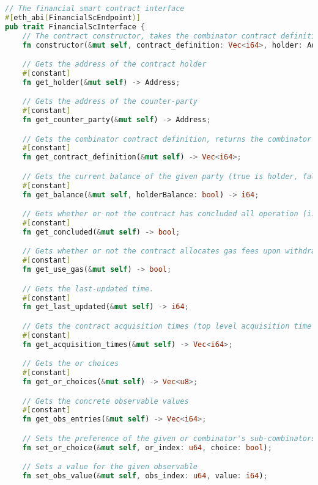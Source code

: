 \begin{lstlisting}[language=Rust, caption={The ABI of the smart contract implementation of SmartFin, defined as a trait in Rust$^1$. See section \ref{smart-contract-ABI} for details.}, captionpos=b, breaklines=true, postbreak=\mbox{\textcolor{red}{$\hookrightarrow$}\space}]
// The financial smart contract interface
#[eth_abi(FinancialScEndpoint)]
pub trait FinancialScInterface {
    // The contract constructor, takes the combinator contract definition (serialized) and the holder address
    fn constructor(&mut self, contract_definition: Vec<i64>, holder: Address, use_gas: bool);

    // Gets the address of the contract holder
    #[constant]
    fn get_holder(&mut self) -> Address;

    // Gets the address of the counter-party
    #[constant]
    fn get_counter_party(&mut self) -> Address;

    // Gets the combinator contract definition, returns the combinator contract serialized
    #[constant]
    fn get_contract_definition(&mut self) -> Vec<i64>;

    // Gets the current balance of the given party (true is holder, false counter-party)
    #[constant]
    fn get_balance(&mut self, holderBalance: bool) -> i64;

    // Gets whether or not the contract has concluded all operation (i.e. updating will never change the balance).
    #[constant]
    fn get_concluded(&mut self) -> bool;

    // Gets whether or not the contract allocates gas fees upon withdrawal.
    #[constant]
    fn get_use_gas(&mut self) -> bool;

    // Gets the last-updated time.
    #[constant]
    fn get_last_updated(&mut self) -> i64;

    // Gets the contract acquisition times (top level acquisition time and anytime acquisition times)
    #[constant]
    fn get_acquisition_times(&mut self) -> Vec<i64>;

    // Gets the or choices
    #[constant]
    fn get_or_choices(&mut self) -> Vec<u8>;

    // Gets the concrete observable values
    #[constant]
    fn get_obs_entries(&mut self) -> Vec<i64>;

    // Sets the preference of the given or combinator's sub-combinators
    fn set_or_choice(&mut self, or_index: u64, choice: bool);

    // Sets a value for the given observable
    fn set_obs_value(&mut self, obs_index: u64, value: i64);


\end{lstlisting}
